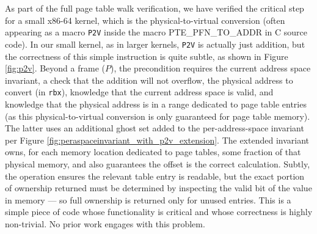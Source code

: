 As part of the full page table walk verification, we have verified the critical step for a small x86-64 kernel, which is the physical-to-virtual
conversion (often appearing as a macro \texttt{P2V} inside the macro \textsf{ PTE\_PFN\_TO\_ADDR} in C source code). In our small kernel, as in larger kernels, \texttt{P2V} is actually just addition,
but the correctness of this simple instruction is quite subtle, as shown in Figure \ref{fig:p2v}.
Beyond a frame ($P$), the precondition requires the current address space invariant, a check that the addition will not overflow, the physical address to convert
(in \lstinline|rbx|), knowledge that the current address space is valid, and knowledge that the physical address is in a range dedicated
to page table entries (as this physical-to-virtual conversion is only guaranteed for page table memory). 
The latter uses an additional ghost set added to the per-address-space
invariant per Figure \ref{fig:peraspaceinvariant_with_p2v_extension}. The extended invariant owns, for each memory location dedicated to page tables, some fraction of
that physical memory, and also guarantees the offset is the correct calculation.
Subtly, the operation ensures the relevant table entry is readable, but the exact portion of ownership returned must be determined by inspecting the valid bit
of the value in memory --- so full ownership is returned only for unused entries.
This is a simple piece of code whose functionality is critical and whose correctness is highly non-trivial. No prior work engages with this problem.

